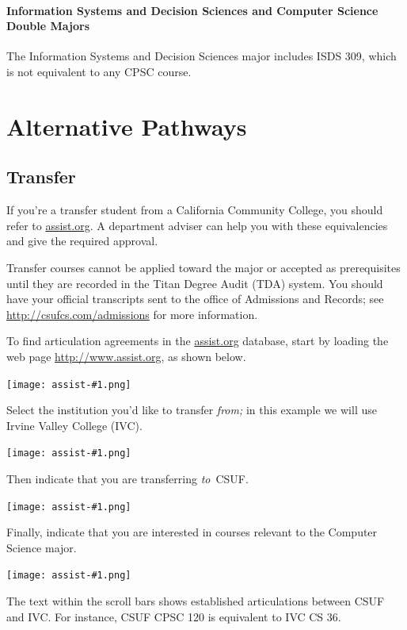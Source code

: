 \documentclass{book}
\newcommand{\CampusName}{CSUF}
\newcommand{\shrunkurl}[1]{\url{http://csufcs.com/#1}}
\begin{document}
\subsubsection{Information Systems and Decision Sciences and Computer Science Double Majors}

The Information Systems and Decision Sciences major includes ISDS 309, which is not equivalent to any CPSC course.
 
\chapter{Alternative Pathways}

\section{Transfer}

If you're a transfer student from a California Community College, you should refer to \url{assist.org}. A department adviser can help you with these equivalencies and give the required approval.

Transfer courses cannot be applied toward the major or accepted as prerequisites until they are recorded in the Titan Degree Audit (TDA) system. You should have your official transcripts sent to the office of Admissions and Records; see \shrunkurl{admissions} for more information.

To find articulation agreements in the \url{assist.org} database, start by loading the web page \url{http://www.assist.org}, as shown below.

\newcommand{\AssistOrgScreenshot}[1]{
  \begin{center}
    \texttt{[image: assist-\#1.png]}
  \end{center}
}

\AssistOrgScreenshot{1}

Select the institution you'd like to transfer \emph{from;} in this example we will use Irvine Valley College (IVC).

\AssistOrgScreenshot{2}

Then indicate that you are transferring \emph{to}~\CampusName.

\AssistOrgScreenshot{3}

Finally, indicate that you are interested in courses relevant to the Computer Science major.

\AssistOrgScreenshot{4}

The text within the scroll bars shows established articulations between CSUF and IVC. For instance, CSUF CPSC 120 is equivalent to IVC CS 36.
\end{document}
